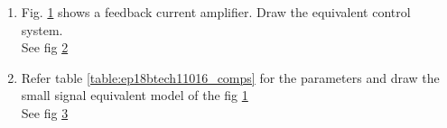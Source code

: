 \begin{enumerate}[label=\arabic*.,ref=\theenumi]

\item Fig. \ref{fig:ep18btech11016_circuit} shows a feedback current amplifier. Draw the equivalent control system.
\\
\solution See fig \ref{fig:ep18btech11016_block}
\\

\renewcommand{\thefigure}{\theenumi.\arabic{figure}}
\begin{figure}[!ht]
	\begin{center}
		\resizebox{\columnwidth}{!}{}
	\end{center}
\caption{}
\label{fig:ep18btech11016_circuit}
\end{figure}
%
\begin{figure}[!ht]
	\begin{center}
		\resizebox{\columnwidth}{!}{}
	\end{center}
\caption{}
\label{fig:ep18btech11016_block}
\end{figure}
\renewcommand{\thefigure}{\theenumi}


\item Refer table \ref{table:ep18btech11016_comps} for the parameters and draw the small signal equivalent model of the fig \ref{fig:ep18btech11016_circuit}
\\
\solution See fig \ref{fig:ep18btech11016_equi}
\\

\begin{table}[!ht]
    \centering
    
    \caption{}
    \label{table:ep18btech11016_comps}
\end{table}

\begin{figure}[!ht]
	\begin{center}
		\resizebox{\columnwidth}{!}{}
	\end{center}
\caption{}
\label{fig:ep18btech11016_equi}
\end{figure}



\end{enumerate}
